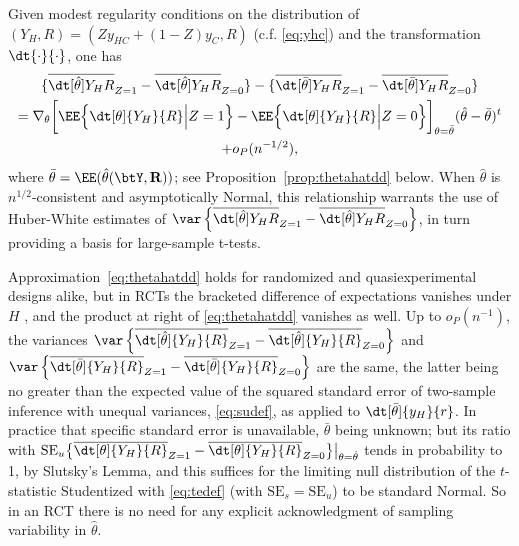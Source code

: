 Given modest regularity conditions on the distribution of
$( Y_{H}, R) = (Z y_{HC} + (1-Z) y_{C}, R)$ (c.f. \eqref{eq:yhc})  and the
transformation $\dt{\cdot }{ \cdot}$, one has
\begin{multline}   \label{eq:thetahatdd}
 \{ \overline{\dt[\hat{\theta}]{Y_{H} }{ {R}}}_{Z=1} -
\overline{\dt[\hat{\theta}]{Y_{H} }{ {R}}}_{Z=0} \} -
\{  \overline{\dt[\bar{\theta} ]{ Y_{H} }{ {R}}}_{Z=1} -
\overline{\dt[\bar{\theta}]{ Y_{H} }{ {R}}}_{Z=0}  \}   \\=
\nabla_{\theta} \bigg[ \EE \Big\{
\dt[\theta]{{{Y}_H} }{ {R}}
\Big| Z=1\Big\}   - \EE \Big\{
\dt[\theta]{{{Y}_H} }{ {R}}
\Big| Z=0\Big\} \bigg]_{\theta=\bar\theta}  (\hat\theta - \bar\theta)^{t}  \\ + o_{P}(n^{-1/2}),
\end{multline}
where $\bar\theta = \EE(\hat\theta({\btY}, \mathbf{R}))$;
see Proposition~\ref{prop:thetahatdd} below.   When $\hat\theta$ is
$n^{1/2}$-consistent and asymptotically Normal, this relationship
warrants the use of Huber-White estimates of
$\var\left\{\overline{\dt[\hat{\theta}]{Y_{H} }{ {R}}}_{Z=1} -
\overline{\dt[\hat{\theta}]{Y_{H} }{ {R}}}_{Z=0}\right\}$,
in turn providing a basis for large-sample t-tests.

Approximation~\eqref{eq:thetahatdd} holds for randomized and
quasiexperimental designs alike, but in RCTs the bracketed difference
of expectations vanishes under $H$
\citep{bowers:hans:2008,lin2013agnostic,lin2013agnosticSupp}, and the
product at right of \eqref{eq:thetahatdd} vanishes as well. Up to
$o_{P}(n^{-1})$, the variances
$\var \left\{ \overline{\dt[\hat\theta]{{Y_H} }{ R}}_{Z=1} -
  \overline{\dt[\hat\theta]{{Y_H}}{ R}}_{Z=0} \right\} $
and
$\var \left\{ \overline{\dt[\bar\theta]{{Y_H} }{ R}}_{Z=1} -
  \overline{\dt[\bar\theta]{{Y_H}}{ R}}_{Z=0} \right\}$
are the same, the latter being no greater than the expected value of
the squared standard error of two-sample inference with unequal
variances, \eqref{eq:sudef}, as applied to
$\dt[\bar\theta]{{y_H} }{ r}$.  In practice that specific standard error
is unavailable, $\bar\theta$ being unknown; but its ratio with
$\mathrm{SE}_{u}\big\{ \overline{\dt[\theta]{{Y_H} }{ R}}_{Z=1} -
\overline{\dt[\theta]{{Y_H}}{ R}}_{Z=0} \big\} \big|_{\theta =
  \hat{\theta}}$ tends in probability to 1, by Slutsky's Lemma,
and this suffices for the limiting null
distribution of the $t$-statistic Studentized with  \eqref{eq:tedef}
(with $\mathrm{SE}_{s} = \mathrm{SE}_{u}$) to be standard Normal.
So in an RCT there is no need for any
explicit acknowledgment of sampling variability in $\hat\theta$.

